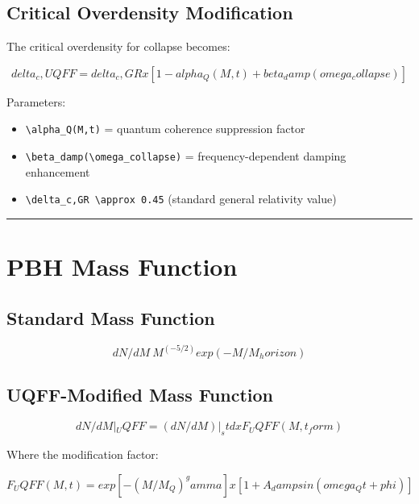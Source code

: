 \documentclass[12pt,a4paper]{article}
\begin{document}
\subsection{Critical Overdensity Modification}

The critical overdensity for collapse becomes:

\begin{equation}
delta_c,UQFF = delta_c,GR x [1 - alpha_Q(M,t) + beta_damp(omega_collapse)]
\end{equation}

Parameters:

\begin{itemize}
  \item \texttt{\textbackslash alpha\_Q(M,t)} = quantum coherence suppression factor
  \item \texttt{\textbackslash beta\_damp(\textbackslash omega\_collapse)} = frequency-dependent damping enhancement
  \item \texttt{\textbackslash delta\_c,GR \textbackslash approx 0.45} (standard general relativity value)
\end{itemize}

\medskip\hrule\medskip

\section{PBH Mass Function}

\subsection{Standard Mass Function}

\begin{equation}
dN/dM ~ M^(-5/2) exp(-M/M_horizon)
\end{equation}

\subsection{UQFF-Modified Mass Function}

\begin{equation}
dN/dM|_UQFF = (dN/dM)|_std x F_UQFF(M,t_form)
\end{equation}

Where the modification factor:

\begin{equation}
F_UQFF(M,t) = exp[-(M/M_Q)^gamma] x [1 + A_damp sin(omega_Q t + phi)]
\end{equation}
\end{document}
